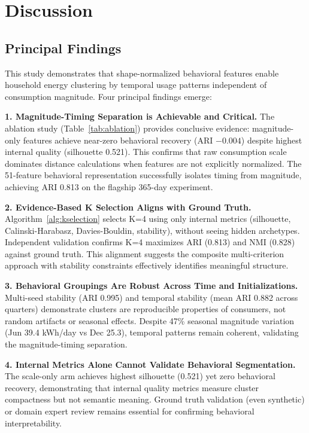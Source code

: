 \section{Discussion}
\label{sec:discussion}

\subsection{Principal Findings}

This study demonstrates that shape-normalized behavioral features enable household energy clustering by temporal usage patterns independent of consumption magnitude. Four principal findings emerge:

\textbf{1. Magnitude-Timing Separation is Achievable and Critical.} The ablation study (Table~\ref{tab:ablation}) provides conclusive evidence: magnitude-only features achieve near-zero behavioral recovery (ARI $-0.004$) despite highest internal quality (silhouette 0.521). This confirms that raw consumption scale dominates distance calculations when features are not explicitly normalized. The 51-feature behavioral representation successfully isolates timing from magnitude, achieving ARI 0.813 on the flagship 365-day experiment.

\textbf{2. Evidence-Based K Selection Aligns with Ground Truth.} Algorithm~\ref{alg:kselection} selects K=4 using only internal metrics (silhouette, Calinski-Harabasz, Davies-Bouldin, stability), without seeing hidden archetypes. Independent validation confirms K=4 maximizes ARI (0.813) and NMI (0.828) against ground truth. This alignment suggests the composite multi-criterion approach with stability constraints effectively identifies meaningful structure.

\textbf{3. Behavioral Groupings Are Robust Across Time and Initializations.} Multi-seed stability (ARI 0.995) and temporal stability (mean ARI 0.882 across quarters) demonstrate clusters are reproducible properties of consumers, not random artifacts or seasonal effects. Despite 47\% seasonal magnitude variation (Jun 39.4 kWh/day vs Dec 25.3), temporal patterns remain coherent, validating the magnitude-timing separation.

\textbf{4. Internal Metrics Alone Cannot Validate Behavioral Segmentation.} The scale-only arm achieves highest silhouette (0.521) yet zero behavioral recovery, demonstrating that internal quality metrics measure cluster compactness but not semantic meaning. Ground truth validation (even synthetic) or domain expert review remains essential for confirming behavioral interpretability.

